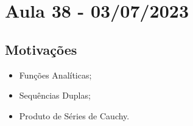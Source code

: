 \documentclass[../analysis_notes.tex]{subfiles}
\begin{document}
\section{Aula 38 - 03/07/2023}
\subsection{Motivações}
\begin{itemize}
	\item Funções Analíticas;
	\item Sequências Duplas;
	\item Produto de Séries de Cauchy.
\end{itemize}
\end{document}
